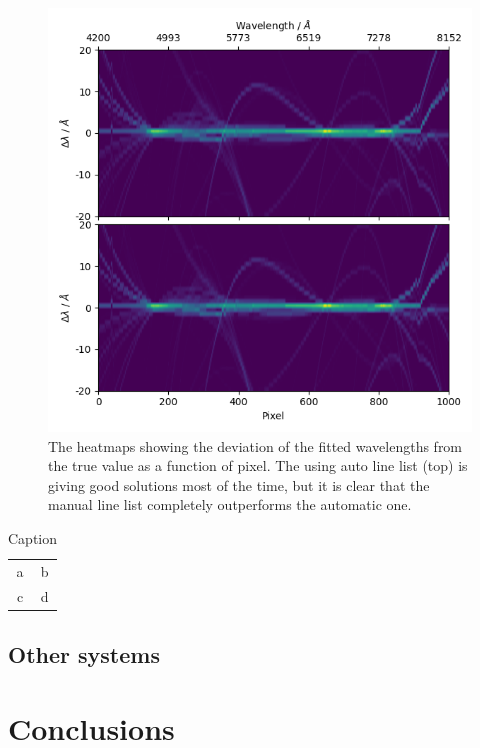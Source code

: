 \documentclass{aa}
\begin{document}
\begin{figure}[h]
    \centering
    \includegraphics[width=\columnwidth]{figure_6_heatmap.png}
    \caption{The heatmaps showing the deviation of the fitted wavelengths from the true value as a function of pixel. The using auto line list (top) is giving good solutions most of the time, but it is clear that the manual line list completely outperforms the automatic one.}
    \label{fig:heatmap}
\end{figure}

\begin{table}[h]
    \centering
    \begin{tabular}{c|c}
        a & b \\
        c & d
    \end{tabular}
    \caption{Caption}
    \label{tab:stats}
\end{table}

\subsection{Other systems}

\section{Conclusions}
\end{document}
